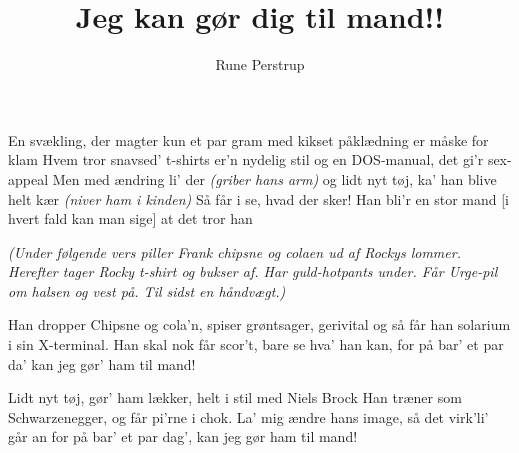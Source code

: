 \documentclass[a4paper,11pt]{article}
\title{Jeg kan gør dig til mand!!}
\author{Rune Perstrup}
\begin{document}
\maketitle

\begin{song} 

 En svækling, der magter kun et par gram
med kikset påklædning er måske for klam
Hvem tror snavsed' t-shirts er'n nydelig stil
og en DOS-manual, det gi'r sex-appeal
Men med ændring li' der \emph{(griber hans arm)}
og lidt nyt tøj, ka' han blive helt kær \emph{(niver ham i kinden)}
Så får i se, hvad der sker!
Han bli'r en stor mand 
[i hvert fald kan man sige]
at det tror han

\emph{(Under følgende vers piller Frank chipsne og colaen ud af Rockys
  lommer. Herefter tager Rocky t-shirt og bukser af. Har guld-hotpants
  under. Får Urge-pil om halsen og vest på. Til sidst en håndvægt.)}

Han dropper Chipsne og cola'n, spiser grøntsager, gerivital
og så får han solarium i sin X-terminal.
Han skal nok får scor't, bare se hva' han kan,
for på bar' et par da' kan jeg gør' ham til mand!

Lidt nyt tøj,  gør' ham lækker, helt i stil med Niels Brock
Han træner som Schwarzenegger, og får pi'rne i chok.
La' mig ændre hans image, så det virk'li' går an
for på bar' et par dag', kan jeg gør ham til mand!


\end{song}
\end{document}
